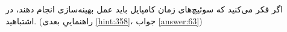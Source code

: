 \section{}
\paragraph{}\label{hint:166}
اگر فکر می‌کنید که سوئیچ‌های زمان کامپایل باید عمل بهینه‌سازی انجام دهند، در اشتباهید. (راهنماییِ بعدی \ref{hint:358}، جواب \ref{answer:63})